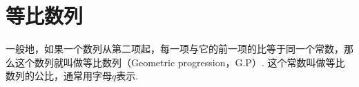 \section*{等比数列}
    一般地，如果一个数列从第二项起，每一项与它的前一项的比等于同一个常数，那么这个数列就叫做等比数列（Geometric progression，G.P）.
    这个常数叫做等比数列的公比，通常用字母$ q $表示.
